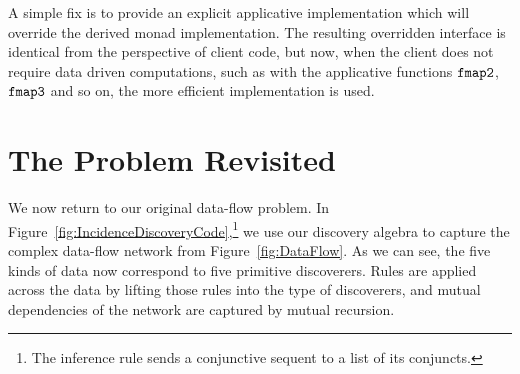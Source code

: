 A simple fix is to provide an explicit applicative implementation which will override the derived monad implementation. The resulting overridden interface is identical from the perspective of client code, but now, when the client does not require data driven computations, such as with the applicative functions $\texttt{fmap2}$, $\texttt{fmap3}$ and so on, the more efficient implementation is used.

\section{The Problem Revisited}\label{sec:Solution}
We now return to our original data-flow problem. In Figure~\ref{fig:IncidenceDiscoveryCode},\footnote{The inference rule  sends a conjunctive sequent to a list of its conjuncts.} we use our discovery algebra to capture the complex data-flow network from Figure~\ref{fig:DataFlow}. As we can see, the five kinds of data now correspond to five primitive discoverers. Rules are applied across the data by lifting those rules into the type of discoverers, and mutual dependencies of the network are captured by mutual recursion.

